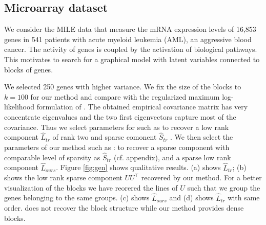 
\subsection{Microarray dataset}

We consider the MILE data \citep{haferlach2010clinical} that measure the mRNA expression levels of 16,853 genes in 541 patients with acute myeloid leukemia (AML), an aggressive blood cancer. The activity of genes is coupled by the activation of biological pathways. This motivates to search for a graphical model with latent variables connected to blocks of genes.

We selected 250 genes with higher variance. We fix the size of the blocks to $k=100$ for our method and compare with the regularized maximum log-likelihood formulation of \citet{chandrasekaran2010}. The obtained empirical covariance matrix has very concentrate eigenvalues and the two first eigenvectors capture most of the covariance. Thus we select parameters for \citet{chandrasekaran2010} such as to recover a low rank component $\hat{L}_{tr}$ of rank two and sparse comonent $\hat{S}_{tr}$  . We then select the parameters of our method such as : to recover a sparse component with comparable level of sparsity as $\hat{S}_{tr}$ (cf. appendix), and a sparse low rank component  $\hat{L}_{ours}$. Figure \ref{fig:gen} shows qualitative results. (a) shows $\hat{L}_{tr}$; (b) shows the low rank sparse component $UU^{\top}$ recovered by our method. For a better visualization of the blocks we have reorered the lines of $U$ such that we group the genes belonging to the same groups. (c) shows $\hat{L}_{ours}$ and (d) shows $\hat{L}_{tr}$ with same order. \citet{chandrasekaran2010} does not recover the block structure while our method provides dense blocks.

